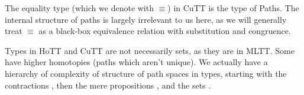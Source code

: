 \begin{definition} \label{path-types}
  The equality type (which we denote with \(\equiv\)) in CuTT is the type of
  Paths\footnotemark.
  The internal structure of paths is largely irrelevant to us here, as we will
  generally treat \(\equiv\) as a black-box equivalence relation with
  substitution and congruence.
\end{definition}

\begin{definition} \label{homotopy-types}
  Types in HoTT and CuTT are not necessarily sets, as they are in MLTT.
  Some have higher homotopies (paths which aren't unique).
  We actually have a hierarchy of complexity of structure of path spaces in
  types, starting with the contractions \cite[definition 3.11.1]{hottbook}, then
  the mere propositions \cite[definition 3.3.1]{hottbook}, and the sets
  \cite[definition 3.1.1]{hottbook}.
  \begin{agdalisting}
  \end{agdalisting}
\end{definition}


